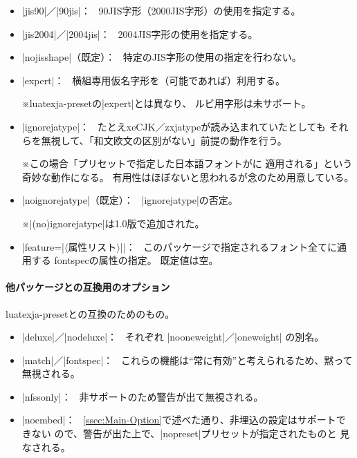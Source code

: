 \documentclass[xelatex,ja=standard,jafont=ipaex,
  a4paper]{bxjsarticle}
\newcommand{\Pkg}[1]{\textsf{#1}}
\newcommand{\Meta}[1]{$\langle$\mbox{}#1\mbox{}$\rangle$}
\newcommand{\Note}{\par\noindent ※}
\newcommand{\Means}{：\ }
\newcommand{\JEmph}{\textgt}
\newcommand{\JSl}{\mbox{／}\linebreak[0]}
\begin{document}
\begin{itemize}
\item |jis90|\JSl|90jis|\Means
90JIS字形（2000JIS字形）の使用を指定する。
\item |jis2004|\JSl|2004jis|\Means
2004JIS字形の使用を指定する。
\item |nojisshape|（既定）\Means
特定のJIS字形の使用の指定を行わない。

\item |expert|\Means
横組専用仮名字形を（可能であれば）利用する。
\Note \Pkg{luatexja-preset}の\>|expert|\>とは異なり、
ルビ用字形は未サポート。

\item |ignorejatype|\Means
たとえ\Pkg{xeCJK}\JSl\Pkg{zxjatype}が読み込まれていたとしても
それらを無視して、「和文欧文の区別がない」前提の動作を行う。
\Note この場合「プリセットで指定した日本語フォントが\JEmph{欧文のみ}に
適用される」という奇妙な動作になる。
有用性はほぼないと思われるが念のため用意している。
\item |noignorejatype|（既定）\Means
|ignorejatype|\>の否定。
\Note |(no)ignorejatype|\>は1.0版で追加された。

\item |feature={|\Meta{属性リスト}|}|\Means
このパッケージで指定されるフォント全てに通用する
\Pkg{fontspec}の属性の指定。
既定値は空。

\end{itemize}

\paragraph{他パッケージとの互換用のオプション}
\Pkg{luatexja-preset}との互換のためのもの。

\begin{itemize}
\item |deluxe|\JSl|nodeluxe|\Means
  それぞれ |nooneweight|\JSl|oneweight| の別名。
\item |match|\JSl|fontspec|\Means
  これらの機能は“常に有効”と考えられるため、黙って無視される。
\item |nfssonly|\Means
  非サポートのため警告が出て無視される。
\item |noembed|\Means
  \ref{ssec:Main-Option}で述べた通り、非埋込の設定はサポートできない
  ので、警告が出た上で、|nopreset|\>プリセットが指定されたものと
  見なされる。
\end{itemize}

\end{document}
